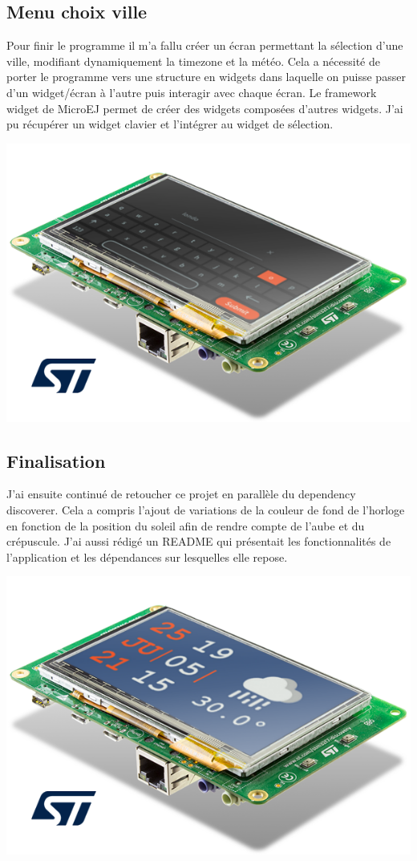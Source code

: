 \documentclass[french,a4paper,12pt]{report}
\begin{document}
\subsection{Menu choix ville}

Pour finir le programme il m’a fallu créer un écran permettant la sélection d’une ville, modifiant dynamiquement la timezone et la météo. Cela a nécessité de porter le programme vers une structure en widgets dans laquelle on puisse passer d’un widget/écran à l’autre puis interagir avec chaque écran.
Le framework widget de MicroEJ permet de créer des widgets composées d’autres widgets. J'ai pu récupérer un widget clavier et l’intégrer au widget de sélection. 

\begin{center}
\includegraphics[width=.5\textwidth]{./ressources/schemas/inSituationSel.png}
\end{center}

\subsection{Finalisation}

J'ai ensuite continué de retoucher ce projet en parallèle du dependency discoverer. Cela a compris l'ajout de variations de la couleur de fond de l'horloge en fonction de la position du soleil afin de rendre compte de l'aube et du crépuscule. J'ai aussi rédigé un README qui présentait les fonctionnalités de l'application et les dépendances sur lesquelles elle repose.

\begin{center}
\includegraphics[width=.5\textwidth]{./ressources/schemas/inSituationFin.png}
\end{center}
\end{document}
